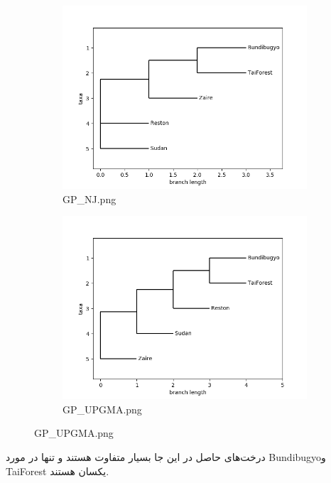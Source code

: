 \documentclass[11pt]{article}
\begin{document}
\newline
\begin{figure}[H]
  \centering
  \begin{subfigure}[b]{0.4\linewidth}
    \includegraphics[width=\linewidth]{../Data/Trees/GP_NJ.png}
    \caption{GP\_NJ.png}
  \end{subfigure}
  \begin{subfigure}[b]{0.4\linewidth}
    \includegraphics[width=\linewidth]{../Data/Trees/GP_UPGMA.png}
    \caption{GP\_UPGMA.png}
  \end{subfigure}
\end{figure}
درخت‌های حاصل در این جا بسیار متفاوت هستند و تنها در مورد Bundibugyoو TaiForest یکسان هستند.
\end{document}
